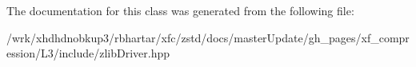 The documentation for this class was generated from the following file\-:\begin{DoxyCompactItemize}
\item 
/wrk/xhdhdnobkup3/rbhartar/xfc/zstd/docs/master\-Update/gh\-\_\-pages/xf\-\_\-compression/\-L3/include/zlib\-Driver.\-hpp\end{DoxyCompactItemize}
